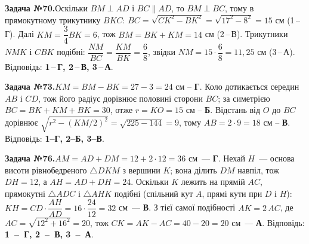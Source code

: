 \documentclass[12pt]{article}
\begin{document}
\par\vspace{0.3cm}\noindent\hypertarget{sol:70}{}
\begin{tcolorbox}[colback=titleBg!40, colframe=mainGreen!55, boxrule=0.4pt, arc=2pt, left=6pt, right=6pt, top=4pt, bottom=4pt, breakable]
\noindent\small\textbf{Задача №70.}\quad Оскільки $BM\perp AD$ і $BC\parallel AD$, то $BM\perp BC$, тому в прямокутному трикутнику $BKC$: $BC=\sqrt{CK^2-BK^2}=\sqrt{17^2-8^2}=15$ см (1\,--\,Г). Далі $KM=\dfrac{3}{4}BK=6$, тож $BM=BK+KM=14$ см (2\,--\,В). Трикутники $NMK$ і $CBK$ подібні: $\dfrac{NM}{BC}=\dfrac{KM}{BK}=\dfrac{6}{8}$, звідки $NM=15\cdot\dfrac{6}{8}=11{,}25$ см (3\,--\,А). Відповідь: \textbf{1\,--\,Г, 2\,--\,В, 3\,--\,А}.
\par\vspace{0.1cm}\hfill\hyperlink{task:70}{}
\end{tcolorbox}
\par\vspace{0.3cm}\noindent\hypertarget{sol:73}{}
\begin{tcolorbox}[colback=titleBg!40, colframe=mainGreen!55, boxrule=0.4pt, arc=2pt, left=6pt, right=6pt, top=4pt, bottom=4pt, breakable]
\noindent\small\textbf{Задача №73.}\quad $KM=BM-BK=27-3=24$ см -- \textbf{Г}. Коло дотикається середин $AB$ і $CD$, тож його радіус дорівнює половині сторони $BC$; за симетрією $BC=BK+KM+BK=30$, отже $r=KO=15$ см -- \textbf{Б}. Відстань від $O$ до $BC$ дорівнює $\sqrt{r^2-(KM/2)^2}=\sqrt{225-144}=9$, тому $AB=2\cdot9=18$ см -- \textbf{В}. Відповідь: \textbf{1--Г, 2--Б, 3--В}.
\par\vspace{0.1cm}\hfill\hyperlink{task:73}{}
\end{tcolorbox}
\par\vspace{0.3cm}\noindent\hypertarget{sol:76}{}
\begin{tcolorbox}[colback=titleBg!40, colframe=mainGreen!55, boxrule=0.4pt, arc=2pt, left=6pt, right=6pt, top=4pt, bottom=4pt, breakable]
\noindent\small\textbf{Задача №76.}\quad $AM=AD+DM=12+2\cdot12=36$ см~--- \textbf{Г}. Нехай $H$~--- основа висоти рівнобедреного $\triangle DKM$ з вершини $K$; вона ділить $DM$ навпіл, тож $DH=12$, а $AH=AD+DH=24$. Оскільки $K$ лежить на прямій $AC$, прямокутні $\triangle ADC$ і $\triangle AHK$ подібні (спільний кут $A$, прямі кути при $D$ і $H$): $KH=CD\cdot\dfrac{AH}{AD}=16\cdot\dfrac{24}{12}=32$ см~--- \textbf{В}. З тієї самої подібності $AK=2\,AC$, де $AC=\sqrt{12^2+16^2}=20$, тож $CK=AK-AC=40-20=20$ см~--- \textbf{А}. Відповідь: \textbf{1~--~Г, 2~--~В, 3~--~А}.
\par\vspace{0.1cm}\hfill\hyperlink{task:76}{}
\end{tcolorbox}
\end{document}
